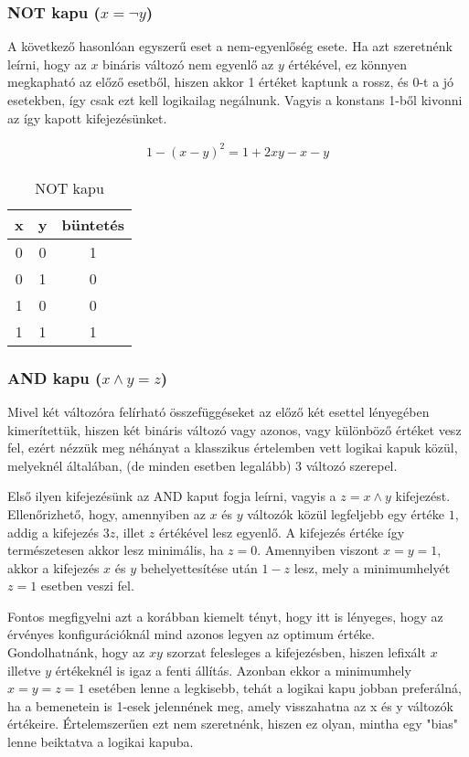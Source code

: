 \subsubsection{NOT kapu ($x= \neg y$)}

A következő hasonlóan egyszerű eset a nem-egyenlőség esete. Ha azt szeretnénk leírni, hogy az $x$ bináris változó nem egyenlő az $y$ értékével, ez könnyen megkapható az előző esetből, hiszen akkor 1 értéket kaptunk a rossz, és 0-t a jó esetekben, így csak ezt kell logikailag negálnunk. Vagyis a konstans 1-ből kivonni az így kapott kifejezésünket.

\begin{align}
	1-(x-y)^2=1+2xy-x-y
\end{align}

\begin{table}[ht]
	\footnotesize
	\centering
	\begin{tabular}{ c c c }
		\toprule
		x & y & büntetés \\
		\midrule
		0 & 0 & 1 \\
		0 & 1 & 0 \\
		1 & 0 & 0 \\
		1 & 1 & 1 \\		
		\bottomrule
	\end{tabular}
	\caption{NOT kapu}
	\label{tab:NOTgate}
\end{table}



\subsubsection{AND kapu ($x \wedge y = z$)}

Mivel két változóra felírható összefüggéseket az előző két esettel lényegében kimerítettük, hiszen két bináris változó vagy azonos, vagy különböző értéket vesz fel, ezért nézzük meg néhányat a klasszikus értelemben vett logikai kapuk közül, melyeknél általában, (de minden esetben legalább) 3 változó szerepel.


Első ilyen kifejezésünk az AND kaput fogja leírni, vagyis a $z=x \wedge y$ kifejezést. Ellenőrizhető, hogy, amennyiben az $x$ és $y$ változók közül legfeljebb egy értéke $1$, addig a kifejezés $3z$, illet $z$ értékével lesz egyenlő. A kifejezés értéke így természetesen akkor lesz minimális, ha $z=0$. Amennyiben viszont $x=y=1$, akkor a kifejezés $x$ és $y$ behelyettesítése után $1-z$ lesz, mely a minimumhelyét $z=1$ esetben veszi fel.

Fontos megfigyelni azt a korábban kiemelt tényt, hogy itt is lényeges, hogy az érvényes konfigurációknál mind azonos legyen az optimum értéke. Gondolhatnánk, hogy az $xy$ szorzat felesleges a kifejezésben, hiszen lefixált $x$ illetve $y$ értékeknél is igaz a fenti állítás. Azonban ekkor a minimumhely $x=y=z=1$ esetében lenne a legkisebb, tehát a logikai kapu jobban preferálná, ha a bemenetein is 1-esek jelennének meg, amely visszahatna az x és y változók értékeire. Értelemszerűen ezt nem szeretnénk, hiszen ez olyan, mintha egy "bias" lenne beiktatva a logikai kapuba.



